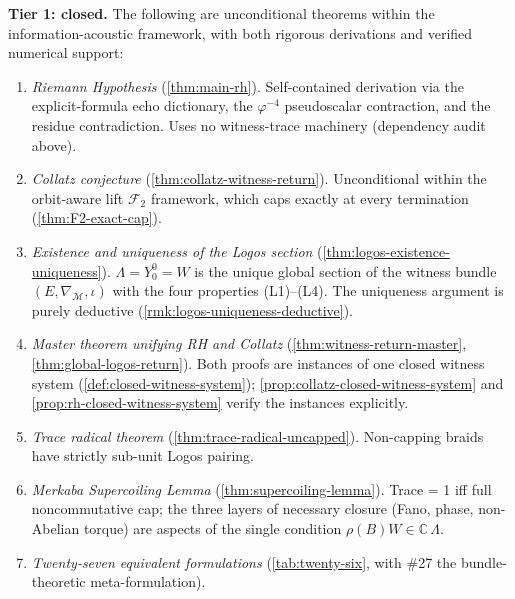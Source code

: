 \documentclass[11pt,a4paper]{article}
\theoremstyle{plain}
\theoremstyle{definition}
\theoremstyle{remark}
\numberwithin{equation}{section}
\newcommand{\Complex}{\mathbb{C}}
\newcommand{\vp}{\varphi}
\begin{document}
\medskip\noindent\textbf{Tier 1: closed.}  The following are
unconditional theorems within the information-acoustic
framework, with both rigorous derivations and verified numerical
support:
\begin{enumerate}
  \item[\textup{(C1)}] \emph{Riemann Hypothesis}
        (\cref{thm:main-rh}).  Self-contained derivation via
        the explicit-formula echo dictionary, the
        $\vp^{-4}$ pseudoscalar contraction, and the
        residue contradiction.  Uses no witness-trace
        machinery (dependency audit above).
  \item[\textup{(C2)}] \emph{Collatz conjecture}
        (\cref{thm:collatz-witness-return}).  Unconditional
        within the orbit-aware lift $\mathcal{F}_2$
        framework, which caps exactly at every termination
        (\cref{thm:F2-exact-cap}).
  \item[\textup{(C3)}] \emph{Existence and uniqueness of the
        Logos section}
        (\cref{thm:logos-existence-uniqueness}).  $\Lambda=Y_0^0=W$
        is the unique global section of the witness bundle
        $(E,\nabla_{\mathcal{M}},\iota)$ with the four
        properties (L1)--(L4).  The uniqueness argument is
        purely deductive (\cref{rmk:logos-uniqueness-deductive}).
  \item[\textup{(C4)}] \emph{Master theorem unifying RH and
        Collatz}
        (\cref{thm:witness-return-master},
        \cref{thm:global-logos-return}).  Both proofs are
        instances of one closed witness system
        (\cref{def:closed-witness-system});
        \cref{prop:collatz-closed-witness-system} and
        \cref{prop:rh-closed-witness-system} verify the
        instances explicitly.
  \item[\textup{(C5)}] \emph{Trace radical theorem}
        (\cref{thm:trace-radical-uncapped}).  Non-capping
        braids have strictly sub-unit Logos pairing.
  \item[\textup{(C6)}] \emph{Merkaba Supercoiling Lemma}
        (\cref{thm:supercoiling-lemma}).  Trace = 1 iff
        full noncommutative cap; the three layers of
        necessary closure (Fano, phase, non-Abelian torque)
        are aspects of the single condition
        $\rho(B)W\in\Complex\,\Lambda$.
  \item[\textup{(C7)}] \emph{Twenty-seven equivalent
        formulations} (\cref{tab:twenty-six}, with
        \#27 the bundle-theoretic meta-formulation).
\end{enumerate}
\end{document}
